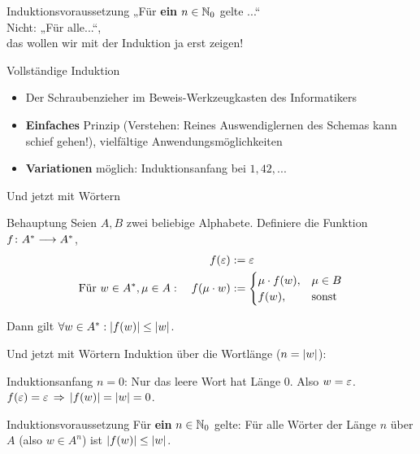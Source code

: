 \begin{frame}{Induktionsvoraussetzung}
	\Huge \centering
	\alert{
		„Für \textbf{ein} $n \in \mathbb{N}_0$ gelte ...“ \\
		\bigskip
		{ \LARGE
		Nicht: „Für alle...“,\\
		das wollen wir mit der Induktion ja erst zeigen!
		}
	}
\end{frame}

\begin{frame}[t]{Vollständige Induktion}
	\begin{itemize}
		\item Der Schraubenzieher im Beweis-Werkzeugkasten des Informatikers
		\item \textbf{Einfaches} Prinzip (Verstehen: Reines Auswendiglernen des Schemas kann schief gehen!), vielfältige Anwendungsmöglichkeiten
		\item \textbf{Variationen} möglich: Induktionsanfang bei $1, 42, ...$
	\end{itemize}
	
\end{frame}




\begin{frame}{Und jetzt mit Wörtern}
	\begin{block}{Behauptung}
		Seien $A, B$ zwei beliebige Alphabete. Definiere die Funktion $f \colon A^* \longrightarrow A^*$,
		\begin{align*}
			f(\varepsilon) &:= \varepsilon \\
			\text{Für } w \in A^*, \mu \in A: \quad f(\mu \cdot w) &:= 
			\begin{cases}
				\mu \cdot f(w), &\mu \in B \\
				f(w), &\text{sonst}
			\end{cases}\\
		\end{align*}
	
	Dann gilt $\forall w \in A^*: \left\lvert f(w) \right\rvert \le \left\lvert w \right\rvert$.
	\end{block}
\end{frame}

\begin{frame}{Und jetzt mit Wörtern}
	Induktion über die Wortlänge ($n = \left\lvert w \right\rvert$):\\[0.5em]
	\pause
	\begin{block}{Induktionsanfang}
		$n = 0$: Nur das leere Wort hat Länge 0. Also $w = \varepsilon$.\\
		$f(\eps) = \eps \impl \size{f(w)} = \size w = 0$. \; \textbf{\checked}
	\end{block}
	\pause
	\begin{block}{Induktionsvoraussetzung}
		Für \textbf{ein} $n \in \mathbb{N}_0$ gelte: Für alle Wörter der Länge $n$ über $A$ (also $w \in A^n$) ist $\left\lvert f(w) \right\rvert \le \left\lvert w \right\rvert$.
	\end{block}
\end{frame}

